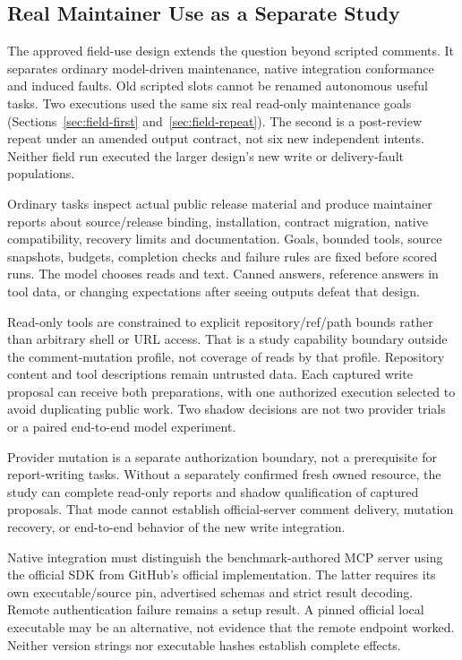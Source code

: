 \documentclass[11pt,letterpaper]{article}
\begin{document}
\subsection{Real Maintainer Use as a Separate Study}

The approved field-use design extends the question beyond scripted comments.
It separates ordinary model-driven maintenance, native integration conformance
and induced faults. Old scripted slots cannot be renamed autonomous useful
tasks. Two executions used the same six real read-only maintenance goals
(Sections~\ref{sec:field-first} and~\ref{sec:field-repeat}). The second is a
post-review repeat under an amended output contract, not six new independent
intents. Neither field run executed the larger design's new write or
delivery-fault populations.

Ordinary tasks inspect actual public release material and produce maintainer
reports about source/release binding, installation, contract migration, native
compatibility, recovery limits and documentation. Goals, bounded tools, source
snapshots, budgets, completion checks and failure rules are fixed before scored
runs. The model chooses reads and text. Canned answers, reference answers in
tool data, or changing expectations after seeing outputs defeat that design.

Read-only tools are constrained to explicit repository/ref/path bounds rather
than arbitrary shell or URL access. That is a study capability boundary outside
the comment-mutation profile, not coverage of reads by that profile. Repository
content and tool descriptions remain untrusted data. Each captured write
proposal can receive both preparations, with one authorized execution selected
to avoid duplicating public work. Two shadow decisions are not two provider
trials or a paired end-to-end model experiment.

Provider mutation is a separate authorization boundary, not a prerequisite for
report-writing tasks. Without a separately confirmed fresh owned resource,
the study can complete read-only reports and shadow qualification of captured
proposals. That mode cannot establish official-server comment delivery, mutation
recovery, or end-to-end behavior of the new write integration.

Native integration must distinguish the benchmark-authored MCP server using
the official SDK from GitHub's official implementation. The latter requires
its own executable/source pin, advertised schemas and strict result decoding.
Remote authentication failure remains a setup result. A pinned official local
executable may be an alternative, not evidence that the remote endpoint worked.
Neither version strings nor executable hashes establish complete effects.
\end{document}
